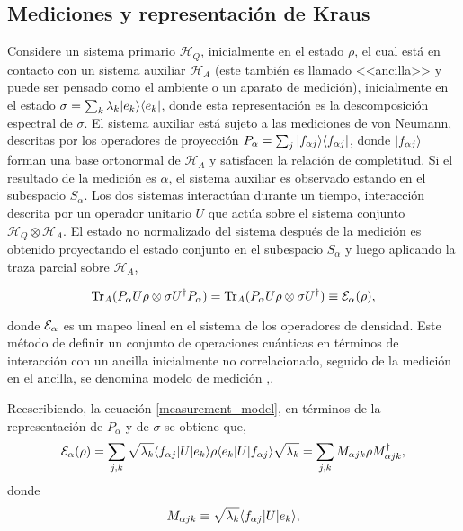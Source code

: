 \subsection{Mediciones y representación de Kraus}\label{Medicion_RepresentacionDeKraus}

Considere un sistema primario $\mathcal{H}_Q$, inicialmente en el estado $\rho$,  el cual está en contacto con un sistema auxiliar $\mathcal{H}_A$ (este también es llamado <<ancilla>> y puede ser pensado como el ambiente o un aparato de medición), inicialmente en el estado $\sigma=\sum_k \lambda_k |e_k\rangle \langle e_k|$, donde esta representación es la descomposición espectral de $\sigma$. El sistema auxiliar está sujeto a las mediciones de von Neumann, descritas por los operadores de proyección $P_\alpha=\sum_j |f_{\alpha j}\rangle \langle f_{\alpha j}|$,  donde $|f_{\alpha j}\rangle$ forman una base ortonormal de $\mathcal{H}_A$ y satisfacen la relación de completitud. Si el resultado de la medición es $\alpha$, el sistema auxiliar es observado estando en el subespacio $S_\alpha$. Los dos sistemas interactúan durante un tiempo, interacción descrita por un operador unitario $U$ que actúa sobre el sistema conjunto $\mathcal{H}_Q\otimes \mathcal{H}_A$. El estado no normalizado del sistema después de la medición es obtenido proyectando el estado conjunto en el subespacio $S_\alpha$ y luego aplicando la traza parcial sobre $\mathcal{H}_A$,

\begin{equation}\label{measurement_model}
    {\rm Tr}_A(P_\alpha U \rho \otimes \sigma U^\dagger P_\alpha)= {\rm Tr}_A(P_\alpha U \rho \otimes \sigma U^\dagger)\equiv \mathcal{E}_\alpha(\rho),
\end{equation}


donde $\mathcal{E}_\alpha$ es un mapeo lineal en el sistema de los operadores de densidad. Este método de definir un conjunto de operaciones cuánticas en términos de interacción con un ancilla inicialmente no correlacionado, seguido de la medición en el ancilla, se denomina modelo de medición {\cite{unm2014},\cite{nielsen_chuang_2010}}.

Reescribiendo, la ecuación {\ref{measurement_model}}, en términos de la representación de $P_\alpha$ y de $\sigma$ se obtiene que,
\begin{equation}
    \mathcal{E}_\alpha(\rho)=\sum_{j,k}\sqrt{\lambda_k}\langle f_{\alpha j}|U|e_k\rangle \rho \langle e_k|U|f_{\alpha j}\rangle \sqrt{\lambda_k}=\sum_{j,k}M_{\alpha j k}\rho M_ {\alpha j k}^\dagger,
\end{equation}
donde \begin{equation} \label{KrausOp1}
    M_{\alpha j k}\equiv \sqrt{\lambda_k}\langle f_{\alpha j}|U|e_k\rangle, 
\end{equation}

